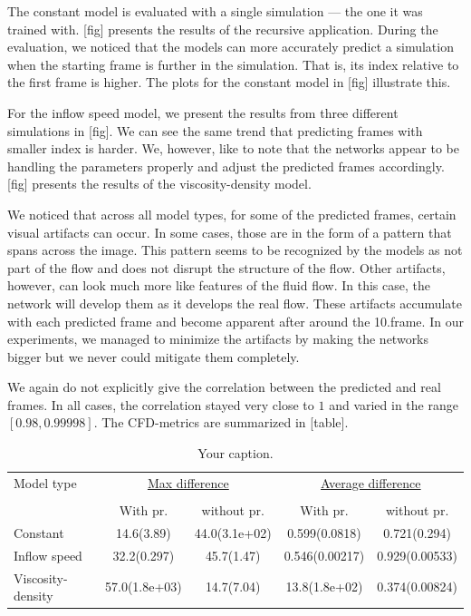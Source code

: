 \documentclass{llncs}
\begin{document}
The constant model is evaluated with a single simulation --- the one it was trained with. [fig] presents the results of the recursive application. During the evaluation, we noticed that the models can more accurately predict a simulation when the starting frame is further in the simulation. That is, its index relative to the first frame is higher. The plots for the constant model in [fig] illustrate this.

For the inflow speed model, we present the results from three different simulations in [fig]. We can see the same trend that predicting frames with smaller index is harder. We, however, like to note that the networks appear to be handling the parameters properly and adjust the predicted frames accordingly. [fig] presents the results of the viscosity-density model.

We noticed that across all model types, for some of the predicted frames, certain visual artifacts can occur. In some cases, those are in the form of a pattern that spans across the image. This pattern seems to be recognized by the models as not part of the flow and does not disrupt the structure of the flow. Other artifacts, however, can look much more like features of the fluid flow. In this case, the network will develop them as it develops the real flow. These artifacts accumulate with each predicted frame and become apparent after around the 10.\@ frame. In our experiments, we managed to minimize the artifacts by making the networks bigger but we never could mitigate them completely.

We again do not explicitly give the correlation between the predicted and real frames. In all cases, the correlation stayed very close to $1$ and varied in the range $[0.98, 0.99998]$. The CFD-metrics are summarized in [table].

\begin{table}
  \begin{center}
    \begin{tabular}{lcc|cc}
      \hline
      \hline
      Model type & \multicolumn{2}{c|}{\underline{Max difference}}  &  \multicolumn{2}{c}{\underline{Average difference}}\\
      \multicolumn{3}{c|}{}&&\\
                 & With pr. & without pr.  &  With pr.& without pr.\\
      \hline
      Constant          &  14.6(3.89)&44.0(3.1e+02)&0.599(0.0818)&0.721(0.294)  \\

      Inflow speed      &  32.2(0.297)&45.7(1.47)&0.546(0.00217)&0.929(0.00533) \\

      Viscosity-density &  57.0(1.8e+03)&14.7(7.04)&13.8(1.8e+02)&0.374(0.00824) \\
    \end{tabular}
  \end{center}
  \caption{\label{tab:table-name} Your caption.}
\end{table}
\end{document}
